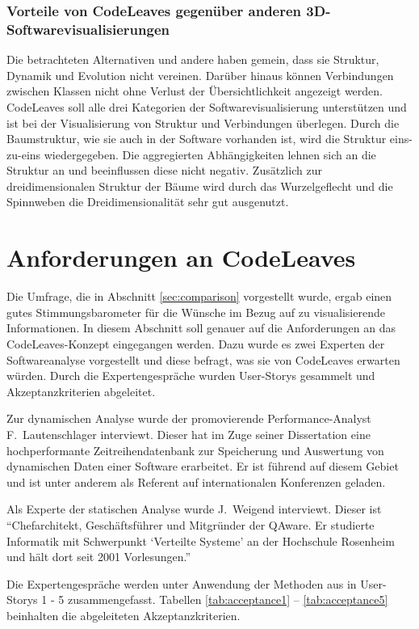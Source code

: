 \subsubsection*{Vorteile von CodeLeaves gegenüber anderen 3D-Softwarevisualisierungen}
Die betrachteten Alternativen und andere haben gemein, dass sie Struktur, Dynamik und Evolution nicht vereinen. Darüber hinaus können Verbindungen zwischen Klassen nicht ohne Verlust der Übersichtlichkeit angezeigt werden. CodeLeaves soll alle drei Kategorien der Softwarevisualisierung unterstützen und ist bei der Visualisierung von Struktur und Verbindungen überlegen. Durch die Baumstruktur, wie sie auch in der Software vorhanden ist, wird die Struktur eins-zu-eins wiedergegeben. Die aggregierten Abhängigkeiten lehnen sich an die Struktur an und beeinflussen diese nicht negativ. Zusätzlich zur dreidimensionalen Struktur der Bäume wird durch das Wurzelgeflecht und die Spinnweben die Dreidimensionalität sehr gut ausgenutzt.

\section{Anforderungen an CodeLeaves}
\label{sec:requirements}

Die Umfrage, die in Abschnitt \ref{sec:comparison} vorgestellt wurde, ergab einen gutes Stimmungsbarometer für die Wünsche im Bezug auf zu visualisierende Informationen. In diesem Abschnitt soll genauer auf die Anforderungen an das CodeLeaves-Konzept eingegangen werden. Dazu wurde es zwei Experten der Softwareanalyse vorgestellt und diese befragt, was sie von CodeLeaves erwarten würden. Durch die Expertengespräche wurden User-Storys gesammelt und Akzeptanzkriterien abgeleitet.

Zur dynamischen Analyse wurde der promovierende Performance-Analyst F.\ Lautenschlager interviewt. Dieser hat im Zuge seiner Dissertation eine hochperformante Zeitreihendatenbank zur Speicherung und Auswertung von dynamischen Daten einer Software erarbeitet. Er ist führend auf diesem Gebiet und ist unter anderem als Referent auf internationalen Konferenzen geladen.

Als Experte der statischen Analyse wurde J.\ Weigend interviewt. Dieser ist "`Chefarchitekt, Geschäftsführer und Mitgründer der QAware. Er studierte Informatik mit Schwerpunkt \enquote*{Verteilte Systeme} an der Hochschule Rosenheim und hält dort seit 2001 Vorlesungen."' \cite{qaware2017johannes}

Die Expertengespräche werden unter Anwendung der Methoden aus \cite{cohn2004user} in User-Storys 1 - 5 zusammengefasst. Tabellen \ref{tab:acceptance1} -- \ref{tab:acceptance5} beinhalten die abgeleiteten Akzeptanzkriterien.

